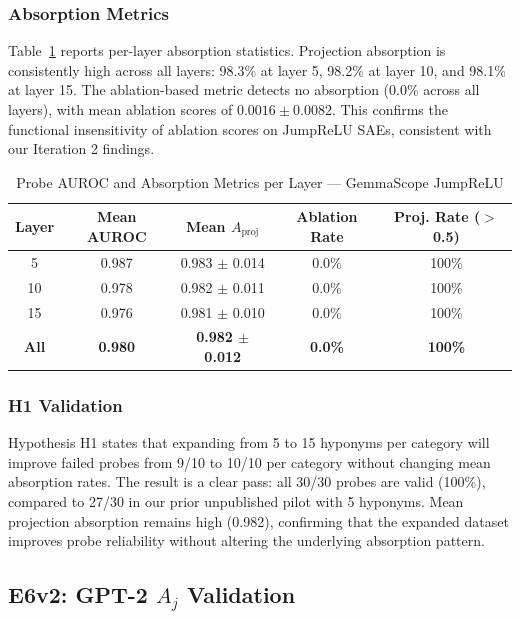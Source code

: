 \documentclass{article}
\begin{document}
\subsubsection{Absorption Metrics}

Table~\ref{tab:e3v2} reports per-layer absorption statistics. Projection absorption is consistently high across all layers: 98.3\% at layer 5, 98.2\% at layer 10, and 98.1\% at layer 15. The ablation-based metric detects no absorption (0.0\% across all layers), with mean ablation scores of $0.0016 \pm 0.0082$. This confirms the functional insensitivity of ablation scores on JumpReLU SAEs, consistent with our Iteration 2 findings.

\begin{table}[t]
\caption{Probe AUROC and Absorption Metrics per Layer --- GemmaScope JumpReLU}
\label{tab:e3v2}
\centering
\small
\begin{tabular}{ccccc}
\toprule
Layer & Mean AUROC & Mean $A_{\text{proj}}$ & Ablation Rate & Proj. Rate ($>$0.5) \\
\midrule
5 & 0.987 & 0.983 $\pm$ 0.014 & 0.0\% & 100\% \\
10 & 0.978 & 0.982 $\pm$ 0.011 & 0.0\% & 100\% \\
15 & 0.976 & 0.981 $\pm$ 0.010 & 0.0\% & 100\% \\
\textbf{All} & \textbf{0.980} & \textbf{0.982 $\pm$ 0.012} & \textbf{0.0\%} & \textbf{100\%} \\
\bottomrule
\end{tabular}
\end{table}

\subsubsection{H1 Validation}

Hypothesis H1 states that expanding from 5 to 15 hyponyms per category will improve failed probes from 9/10 to 10/10 per category without changing mean absorption rates. The result is a clear pass: all 30/30 probes are valid (100\%), compared to 27/30 in our prior unpublished pilot with 5 hyponyms. Mean projection absorption remains high (0.982), confirming that the expanded dataset improves probe reliability without altering the underlying absorption pattern.

\subsection{E6v2: GPT-2 $A_j$ Validation}
\label{sec:e6v2}
\end{document}
